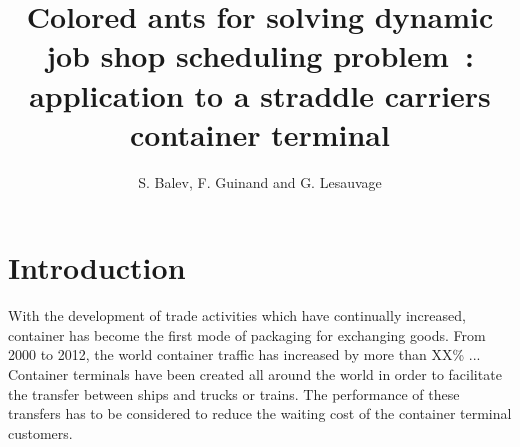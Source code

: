 \documentclass[a4paper,10pt]{article}
\title{Colored ants for solving dynamic job shop scheduling problem : application to a straddle carriers container terminal
}
\author{S. Balev, F. Guinand and G. Lesauvage}
\begin{document}
\maketitle

\begin{abstract}

\end{abstract}

\section{Introduction}

With the development of trade activities which have continually increased, container has become the first mode of packaging for exchanging goods. From 2000 to 2012, the world container traffic has increased by more than XX\% ... Container terminals have been created all around the world in order to facilitate the transfer between ships and trucks or trains. The performance of these transfers has to be considered to reduce the waiting cost of the container terminal customers.




\end{document}
